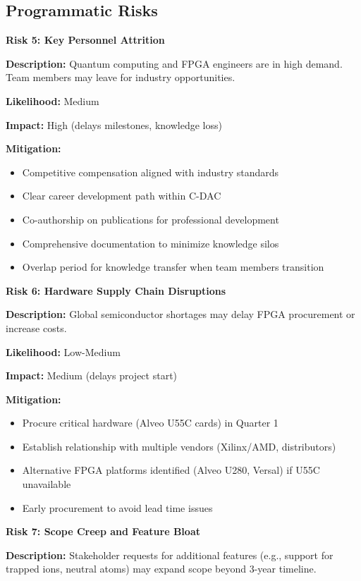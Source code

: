 \documentclass[12pt,a4paper]{article}
\begin{document}
\subsection{Programmatic Risks}

\textbf{Risk 5: Key Personnel Attrition}

\textbf{Description:} Quantum computing and FPGA engineers are in high demand. Team members may leave for industry opportunities.

\textbf{Likelihood:} Medium

\textbf{Impact:} High (delays milestones, knowledge loss)

\textbf{Mitigation:}
\begin{itemize}[noitemsep]
\item Competitive compensation aligned with industry standards
\item Clear career development path within C-DAC
\item Co-authorship on publications for professional development
\item Comprehensive documentation to minimize knowledge silos
\item Overlap period for knowledge transfer when team members transition
\end{itemize}

\textbf{Risk 6: Hardware Supply Chain Disruptions}

\textbf{Description:} Global semiconductor shortages may delay FPGA procurement or increase costs.

\textbf{Likelihood:} Low-Medium

\textbf{Impact:} Medium (delays project start)

\textbf{Mitigation:}
\begin{itemize}[noitemsep]
\item Procure critical hardware (Alveo U55C cards) in Quarter 1
\item Establish relationship with multiple vendors (Xilinx/AMD, distributors)
\item Alternative FPGA platforms identified (Alveo U280, Versal) if U55C unavailable
\item Early procurement to avoid lead time issues
\end{itemize}

\textbf{Risk 7: Scope Creep and Feature Bloat}

\textbf{Description:} Stakeholder requests for additional features (e.g., support for trapped ions, neutral atoms) may expand scope beyond 3-year timeline.
\end{document}
